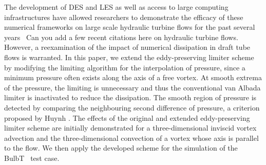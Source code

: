 The development of DES and LES as well as access to large computing infrastructures have allowed researchers to demonstrate the efficacy of these numerical frameworks on large scale hydraulic turbine flows for the past several years~\cite{} {\color{red} Can you add a few recent citations here on hydraulic turbine flows}. However, a reexamination of the impact of numerical dissipation  in draft tube flows is warranted. In this paper, we extend the eddy-preserving limiter scheme by modifying the limiting algorithm for the interpolation of pressure, since a minimum pressure often exists along the axis of a free vortex. At smooth extrema of the pressure, the limiting is unnecessary and thus the conventional van Albada limiter is inactivated to reduce the dissipation. The smooth region of pressure is detected by comparing the neighbouring second difference of pressure, a criterion proposed by Huynh \cite{huynh1995accurate}. The effects of the original and extended eddy-preserving limiter scheme are initially demonstrated for a three-dimensional inviscid vortex advection and the three-dimensional convection of a vortex whose axis is parallel to the flow. We then apply the developed scheme for the simulation of the BulbT~\cite{vu2014cfd} test case.